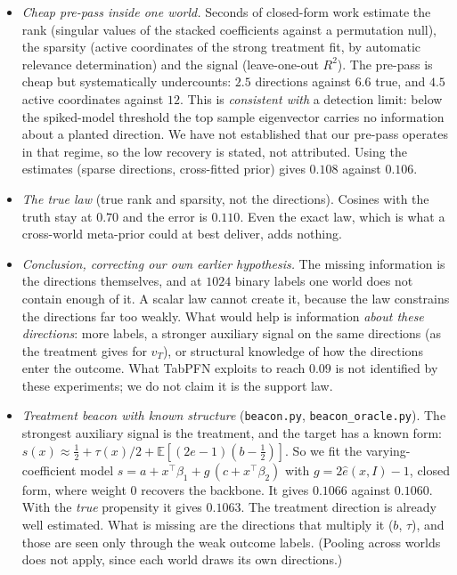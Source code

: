 \documentclass[11pt]{article}
\theoremstyle{definition}
\theoremstyle{remark}
\begin{document}
\begin{itemize}
  \item \emph{Cheap pre-pass inside one world.} Seconds of closed-form work estimate the rank (singular values of the stacked coefficients against a permutation null), the sparsity (active coordinates of the strong treatment fit, by automatic relevance determination) and the signal (leave-one-out $R^2$). The pre-pass is cheap but systematically undercounts: $2.5$ directions against $6.6$ true, and $4.5$ active coordinates against $12$. This is \emph{consistent with} a detection limit: below the spiked-model threshold \cite{bbp05} the top sample eigenvector carries no information about a planted direction. We have not established that our pre-pass operates in that regime, so the low recovery is stated, not attributed. Using the estimates (sparse directions, cross-fitted prior) gives $0.108$ against $0.106$.
  \item \emph{The true law} (true rank and sparsity, not the directions). Cosines with the truth stay at $0.70$ and the error is $0.110$. Even the exact law, which is what a cross-world meta-prior could at best deliver, adds nothing.
  \item \emph{Conclusion, correcting our own earlier hypothesis.} The missing information is the directions themselves, and at $1024$ binary labels one world does not contain enough of it. A scalar law cannot create it, because the law constrains the directions far too weakly. What would help is information \emph{about these directions}: more labels, a stronger auxiliary signal on the same directions (as the treatment gives for $v_T$), or structural knowledge of how the directions enter the outcome. What TabPFN exploits to reach $0.09$ is not identified by these experiments; we do not claim it is the support law.
  \item \emph{Treatment beacon with known structure} (\texttt{beacon.py}, \texttt{beacon\_oracle.py}). The strongest auxiliary signal is the treatment, and the target has a known form: $s(x)\approx\tfrac12+\tau(x)/2+\mathbb E[(2e-1)(b-\tfrac12)]$. So we fit the varying-coefficient model $s=a+x^\top\beta_1+g\,(c+x^\top\beta_2)$ with $g=2\hat e(x,I)-1$, closed form, where weight $0$ recovers the backbone. It gives $0.1066$ against $0.1060$. With the \emph{true} propensity it gives $0.1063$. The treatment direction is already well estimated. What is missing are the directions that multiply it ($b$, $\tau$), and those are seen only through the weak outcome labels. (Pooling across worlds does not apply, since each world draws its own directions.)
\end{itemize}
\end{document}
